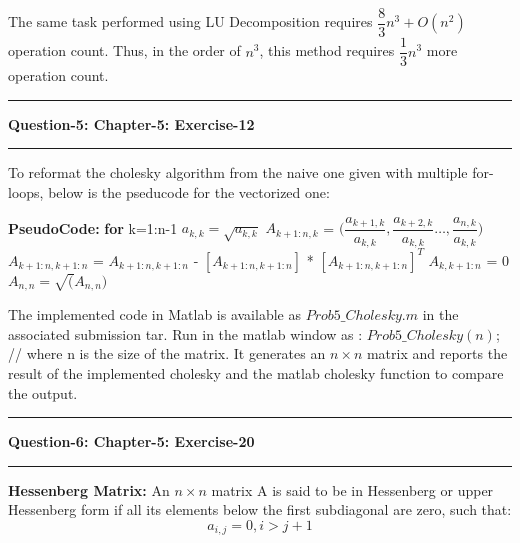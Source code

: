\documentclass{article}
\newcommand\question[2]{\vspace{.25in}\hrule\textbf{#1: #2}\hrule\vspace{.10in}}
\newcommand\pseudoCode{\vspace{.10in}\textbf{PseudoCode: }}
\begin{document}
The same task performed using LU Decomposition requires $\dfrac{8}{3}n^3 + O(n^2)$ operation count. Thus, in the order of $n^3$, this method requires $\dfrac{1}{3}n^3$ more operation count. 


\question{Question-5}{Chapter-5: Exercise-12}
 To reformat the cholesky algorithm from the naive one given with multiple for-loops, below is the pseducode for the vectorized one: \newline

\pseudoCode \newline
\hspace*{0.5cm} \textbf {for} k=1:n-1 \newline
\hspace*{1cm}                       $a_{k,k} = \sqrt{a_{k,k}}$ \newline
\hspace*{1cm}                      $A_{k+1:n, k}$ = $\bigg (  \dfrac{a_{k+1,k}}{a_{k,k}} , \dfrac{a_{k+2,k}}{a_{k,k}} \dots ,\dfrac{a_{n,k}}{a_{k,k}}\bigg )$ \newline
\hspace*{1cm}                      $A_{k+1:n,k+1:n}$ = $A_{k+1:n,k+1:n}$ - $[A_{k+1:n,k+1:n}]$ * $[A_{k+1:n,k+1:n}]^T$ \newline
\hspace*{1cm}                     $A_{k,k+1:n}$ = 0 \newline
\hspace*{0.5cm}   $A_{n,n} = \sqrt(A_{n,n})$ \newline

The implemented code in Matlab is available as $Prob5\_Cholesky.m$  in the associated submission tar. Run in the matlab window as :\newline
$Prob5\_Cholesky(n)$;  // where n is the size of the matrix. It generates an $n \times n$ matrix and reports the result of the implemented cholesky and the matlab cholesky function to compare the output. \newline


\question{Question-6}{Chapter-5: Exercise-20}
\textbf {Hessenberg Matrix:} An $n \times n$ matrix A is said to be in Hessenberg or upper Hessenberg form if all its elements below the first subdiagonal are zero, such that:\newline
\[ a_{i,j} = 0, i>j+1\]
\end{document}
